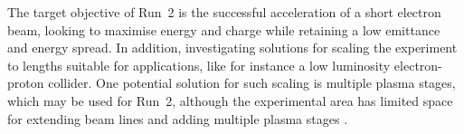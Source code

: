 

The target objective of Run~2 is the successful acceleration of a short electron beam, looking to maximise energy and charge while retaining a low emittance and energy spread.
In addition, investigating solutions for scaling the experiment to lengths suitable for applications, like for instance a low luminosity electron-proton collider.
One potential solution for such scaling is multiple plasma stages, which may be used for Run~2, although the experimental area has limited space for extending beam lines and adding multiple plasma stages \cite{adli:2016a}.

